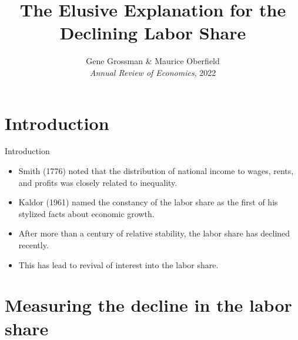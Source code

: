 \documentclass[notes=show]{beamer}
\begin{document}
\title{The Elusive Explanation for the Declining Labor Share}
\subtitle{}
\date{Gene Grossman \& Maurice Oberfield \bigskip \\
\textit{Annual Review of Economics}, 2022}
\author{}
\maketitle



\section{Introduction}

\begin{frame}{Introduction}
\begin{itemize}
\item Smith (1776) noted that the distribution of national income to wages, rents, and profits was closely related to inequality. \medskip
\item Kaldor (1961) named the constancy of the labor share as the first of his stylized facts about economic growth. \medskip
\item After more than a century of relative stability, the labor share has declined recently. \medskip
\item This has lead to revival of interest into the labor share.
\end{itemize}
\end{frame}


\section{Measuring the decline in the labor share}
\end{document}
